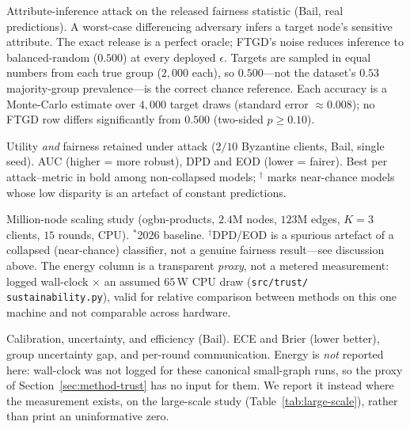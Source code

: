 \documentclass[pdflatex,sn-mathphys-num]{sn-jnl}
\theoremstyle{thmstyleone}%
\theoremstyle{thmstyletwo}%
\theoremstyle{thmstylethree}%
\begin{document}
\clearpage

\begin{table}[htbp]\centering\small
\caption{Attribute-inference attack on the released fairness statistic (Bail,
real predictions). A worst-case differencing adversary infers a target node's
sensitive attribute. The exact release is a perfect oracle; FTGD's noise reduces
inference to balanced-random ($0.500$) at every deployed $\epsilon$. Targets are
sampled in equal numbers from each true group ($2{,}000$ each), so $0.500$---not
the dataset's $0.53$ majority-group prevalence---is the correct chance
reference. Each accuracy is a Monte-Carlo estimate over $4{,}000$ target draws
(standard error $\approx0.008$); no FTGD row differs significantly from $0.500$
(two-sided $p\ge0.10$).}
\label{tab:privacy-attack}

\end{table}

\clearpage

\begin{table}[htbp]\centering\small
\caption{Utility \emph{and} fairness retained under attack ($2/10$ Byzantine
clients, Bail, single seed). AUC (higher = more robust), DPD and EOD (lower =
fairer). Best per attack--metric in bold among non-collapsed models;
$^{\dagger}$ marks near-chance models whose low disparity is an artefact of
constant predictions.}
\label{tab:robustness}
{\footnotesize\setlength{\tabcolsep}{3.5pt}}
\end{table}

\clearpage

\begin{table}[htbp]\centering\small
\caption{Million-node scaling study (ogbn-products, $2.4$M nodes, $123$M
edges, $K{=}3$ clients, $15$ rounds, CPU). $^{\ast}$2026 baseline.
$^{\dagger}$DPD/EOD is a spurious artefact of a collapsed (near-chance)
classifier, not a genuine fairness result---see discussion above. The energy
column is a transparent \emph{proxy}, not a metered measurement: logged
wall-clock $\times$ an assumed $65$\,W CPU draw (\texttt{src/trust/
sustainability.py}), valid for relative comparison between methods on this one
machine and not comparable across hardware.}
\label{tab:large-scale}

\end{table}

\clearpage

\begin{table}[htbp]\centering\small
\caption{Calibration, uncertainty, and efficiency (Bail). ECE and Brier
(lower better), group uncertainty gap, and per-round communication. Energy is
\emph{not} reported here: wall-clock was not logged for these canonical
small-graph runs, so the proxy of Section~\ref{sec:method-trust} has no input
for them. We report it instead where the measurement exists, on the large-scale
study (Table~\ref{tab:large-scale}), rather than print an uninformative zero.}
\label{tab:efficiency}

\end{table}
\end{document}
